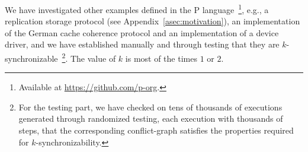 %



We have investigated other examples defined in the P language~\footnote{Available at \url{https://github.com/p-org}.}, e.g., a replication storage protocol (see Appendix~\ref{asec:motivation}), an implementation of the German cache coherence protocol and an implementation of a device driver, and we have established manually and through testing that they are $k$-synchronizable~\footnote{For the testing part, we have checked on tens of thousands of executions generated through randomized testing, each execution with thousands of steps, that the corresponding conflict-graph satisfies the properties required for $k$-synchronizability.}. The value of $k$ is most of the times $1$ or $2$.


%

%

